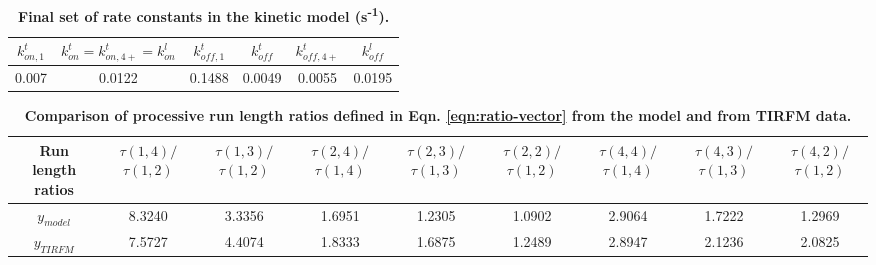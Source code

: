\begin{table}[!htb]
\centering
\begin{tabular}{ c c c c c c }
\toprule 
$k_{on,1}^{t}$ & $k_{on}^{t}=k_{on,4+}^{t}=k_{on}^{l}$ & $k_{off,1}^{t}$ & $k_{off}^{t}$ & $k_{off,4+}^{t}$ & $k_{off}^{l}$ \\
\midrule
0.007 & 0.0122 & 0.1488 & 0.0049 & 0.0055 & 0.0195 \\
\bottomrule
\end{tabular}
\caption[Final set of rate constants in the kinetic model (s\textsuperscript{-1}).]{\textbf{Final set of rate constants in the kinetic model (s\textsuperscript{-1}).}}
\label{tab:model-rates}
\end{table}

\begin{table}[!htb]
\centering
\begin{tabulary}{1.0\textwidth}{C C C C C C C C C}
\toprule 
Run length ratios & $\tau(1,4)/$ $\tau(1,2)$ & $\tau(1,3)/$ $\tau(1,2)$ & $\tau(2,4)/$ $\tau(1,4)$ & $\tau(2,3)/$ $\tau(1,3)$ & $\tau(2,2)/$ $\tau(1,2)$ & $\tau(4,4)/$ $\tau(1,4)$ & $\tau(4,3)/$ $\tau(1,3)$ & $\tau(4,2)/$ $\tau(1,2)$ \\
\midrule
$y_{model}$ & 8.3240 & 3.3356 & 1.6951 & 1.2305 & 1.0902 & 2.9064 & 1.7222 & 1.2969 \\
$y_{TIRFM}$ & 7.5727 & 4.4074 & 1.8333 & 1.6875 & 1.2489 & 2.8947 & 2.1236 & 2.0825 \\
\bottomrule
\end{tabulary}
\caption[Comparison of processive run length ratios from the model and TIRFM data.]{\textbf{Comparison of processive run length ratios defined in Eqn. \ref{eqn:ratio-vector} from the model and from TIRFM data.}}
\label{tab:model-ratios}
\end{table}